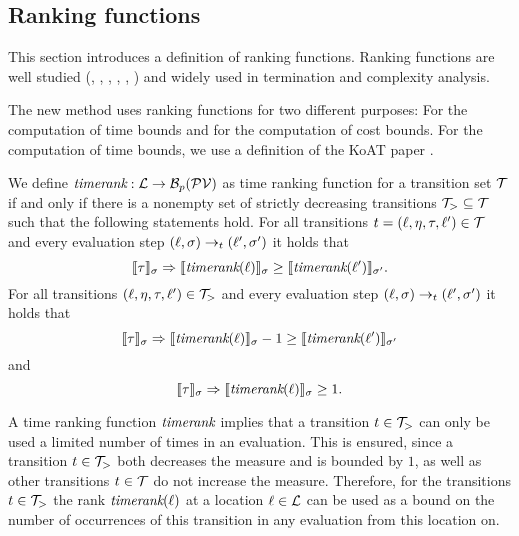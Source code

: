 \subsection{Ranking functions}

This section introduces a definition of ranking functions.
Ranking functions are well studied (\cite{bradley2005polyranking}, \cite{podelski2004prf}, \cite{bradley2005linear}, \cite{bagnara2012new}, \cite{leike2014ranking}, \cite{ben2013linear}) and widely used in termination and complexity analysis.

The new method uses ranking functions for two different purposes:
For the computation of time bounds and for the computation of cost bounds.
For the computation of time bounds, we use a definition of the KoAT paper \cite{koat}.

\begin{definition} 
  We define $\emph{timerank}: \mathcal{L} \rightarrow \mathcal{B}_p(\mathcal{PV})$ as time ranking function for a transition set $\mathcal{T}$ if and only if there is a nonempty set of strictly decreasing transitions $\mathcal{T}_{>} \subseteq \mathcal{T}$ such that the following statements hold.
  For all transitions $t = (\ell, \eta, \tau, \ell') \in \mathcal{T}$ and every evaluation step $(\ell, \sigma) \rightarrow_t (\ell', \sigma')$ it holds that
  \[ \llbracket \tau \rrbracket_{\sigma} \Rightarrow \llbracket \emph{timerank}(\ell) \rrbracket_{\sigma} \geq \llbracket \emph{timerank}(\ell') \rrbracket_{\sigma'}. \]
  For all transitions $(\ell, \eta, \tau, \ell') \in \mathcal{T}_{>}$ and every evaluation step $(\ell, \sigma) \rightarrow_t (\ell', \sigma')$ it holds that        
  \[ \llbracket \tau \rrbracket_{\sigma} \Rightarrow \llbracket \emph{timerank}(\ell) \rrbracket_{\sigma} - 1 \geq \llbracket \emph{timerank}(\ell') \rrbracket_{\sigma'} \]
  and
  \[ \llbracket \tau \rrbracket_{\sigma} \Rightarrow \llbracket \emph{timerank}(\ell) \rrbracket_{\sigma} \geq 1. \]
\end{definition}

A time ranking function $\emph{timerank}$ implies that a transition $t \in \mathcal{T}_>$ can only be used a limited number of times in an evaluation.
This is ensured, since a transition $t \in \mathcal{T}_>$ both decreases the measure and is bounded by $1$, as well as other transitions $t \in \mathcal{T}$ do not increase the measure.
Therefore, for the transitions $t \in \mathcal{T}_>$ the rank $\emph{timerank}(\ell)$ at a location $\ell \in \mathcal{L}$ can be used as a bound on the number of occurrences of this transition in any evaluation from this location on.

